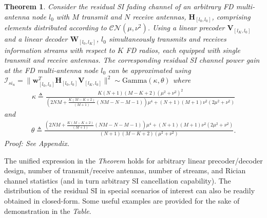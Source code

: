 \documentclass[onecolumn]{IEEEtran}
\newtheorem*{thm*}{Theorem}
\begin{document}
\begin{thm*} 
\label{thm:SI-MIMO}
Consider the residual SI fading channel of an arbitrary FD multi-antenna node $l_{0}$ with $M$ transmit and $N$ receive antennas, $\boldsymbol{H}_{[l_{0},l_{0}]}$, comprising elements distributed according to $\mathcal{C}\mathcal{N} (\mu,\nu^{2})$. Using a linear precoder $\boldsymbol{V}_{[l_{K},l_{0}]}$ and a linear decoder $\boldsymbol{W}_{[l_{0},l_{K}]}$, $l_{0}$ simultaneously transmits and receives information streams with respect to $K$ FD radios, each equipped with single transmit and receive antennas. The corresponding residual SI channel power gain at the FD multi-antenna node $l_{0}$ can be approximated using $\mathcal{I}_{si_{u}} = \| \boldsymbol{w}^{T}_{[l_{0},l_{k}]} \boldsymbol{H}_{[l_{0},l_{0}]} \boldsymbol{V}_{[l_{K},l_{0}]} \|^{2} \sim \text{Gamma} \left( \kappa,\theta \right)$ where
\begin{align}
\kappa 
\triangleq  \tfrac{ K (N + 1) \left( M - K + 2 \right) \left( \mu^{2} + \nu^{2} \right)^{2}}{\left( 2 N M + \tfrac{K \left( M - K + 2 \right) }{(M + 1)} ( N M - N - M - 1) \right) \mu^4 + (N + 1) (M + 1) \nu ^2 \left( 2 \mu ^2 + \nu^2 \right)}   
\end{align}
and
\begin{align}
\theta 
\triangleq \tfrac{\left( 2 N M + \tfrac{K \left( M - K + 2 \right) }{(M + 1)} ( N M - N - M - 1) \right) \mu^4 + (N + 1) (M + 1) \nu ^2 \left( 2 \mu ^2 + \nu^2 \right)}{ (N + 1) \left( M - K + 2 \right) \left( \mu^{2} + \nu^{2} \right)}. 
\end{align}
\textit{Proof:} See Appendix.
\end{thm*}

The unified expression in the \textit{Theorem} holds for arbitrary linear precoder/decoder design, number of transmit/receive antennas, number of streams, and Rician channel statistics (and in turn arbitrary SI cancellation capability). The distribution of the residual SI in special scenarios of interest can also be readily obtained in closed-form. Some useful examples are provided for the sake of demonstration in the \textit{Table}.       
\end{document}
